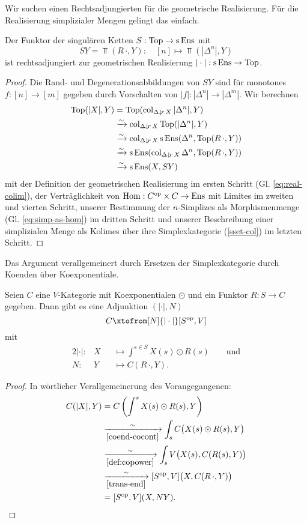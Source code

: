 Wir suchen einen Rechtsadjungierten für die geometrische
Realisierung. Für die Realisierung simplizialer Mengen gelingt das
einfach.
\begin{satz}
  Der Funktor der singulären Ketten $S: \operatorname{Top} \to \operatorname{s}\operatorname{Ens}$ mit
  \[ SY  = \Top(R \, \cdot, Y): \quad [n] \mapsto \Top(|\Delta^n|, Y)
  \]
  ist rechtsadjungiert zur geometrischen Realisierung $|\cdot|: \operatorname{s}\operatorname{Ens}
  \to \operatorname{Top}$.
\end{satz}
\begin{proof}
  Die Rand- und Degenerationsabbildungen von $SY$ sind für monotones
  $f: [n] \to [m]$ gegeben durch Vorschalten von $|f|: |\Delta^n| \to
  |\Delta^m|$. Wir berechnen
  \begin{align*}
    \operatorname{Top}(|X|, Y)
    & = \operatorname{Top}(\operatorname{col}_{\Delta \downarrow \! {\scriptstyle r} \, X} |\Delta^n|, Y) \\
    & \xrightarrow[]{\sim} \operatorname{col}_{\Delta \downarrow \! {\scriptstyle r} \, X} \operatorname{Top}(|\Delta^n|, Y) \\
    & \xrightarrow[]{\sim} \operatorname{col}_{\Delta \downarrow \! {\scriptstyle r} \, X} \operatorname{s}\operatorname{Ens}(\Delta^n, \operatorname{Top}(R \, \cdot, Y)) \\
    & \xrightarrow[]{\sim} \operatorname{s}\operatorname{Ens}(\operatorname{col}_{\Delta \downarrow \! {\scriptstyle r} \, X} \Delta^n, \operatorname{Top}(R \, \cdot, Y)) \\
    & \xrightarrow[]{\sim} \operatorname{s}\operatorname{Ens}(X, SY)
  \end{align*}  
  mit der Definition der geometrischen Realisierung im ersten Schritt
  (Gl. \ref{eq:real-colim}), der Verträglichkeit von $\operatorname{Hom}: C^\mathrm{op}
  \times C \to \operatorname{Ens}$ mit Limites im zweiten und vierten Schritt,
  unserer Bestimmung der $n$-Simplizes als Morphismenmenge
  (Gl. \ref{eq:simp-as-hom}) im dritten Schritt und unserer
  Beschreibung einer simplizialen Menge als Kolimes über ihre
  Simplexkategorie (\ref{sset-col}) im letzten Schritt.
\end{proof}
Das Argument verallgemeinert durch Ersetzen der Simplexkategorie durch
Koenden über Koexponentiale.
\begin{theorem} 
  \label{nerve}
  Seien $C$ eine $V$-Kategorie mit Koexponentialen $\odot$ und ein
  Funktor $R: S \to C$ gegeben. Dann gibt es eine Adjunktion
  $(|\cdot|, N)$
  \[ C \xtofrom[N]{|\cdot|} [S\op, V] \]
  mit
  \begin{alignat*}{2}
    |\cdot|: & X &&\mapsto \int^{s \in S} X(s) \odot R(s) \qquad \text{und} \\
    N: & Y &&\mapsto C(R \, \cdot, Y).
  \end{alignat*}
\end{theorem}
\begin{proof}
  In wörtlicher Verallgemeinerung des Vorangegangenen:
  \begin{align*}
     C(|X|, Y)
     &= C \left( \int^s X(s) \odot R(s), Y \right) \\
     & \xrightarrow[\ref{coend-cocont}]{\sim}
       \int_s C \big( X(s) \odot R(s), Y \big) \\
     & \xrightarrow[\ref{def:copower}]{\sim}
       \int_s V \big( X(s), C(R(s), Y) \big) \\
     & \xrightarrow[\ref{trans-end}]{\sim}
       [S^\mathrm{op}, V] \big( X, C(R \, \cdot, Y) \big) \\
     &= [S^\mathrm{op}, V] (X, NY).
  \end{align*}
\end{proof}
